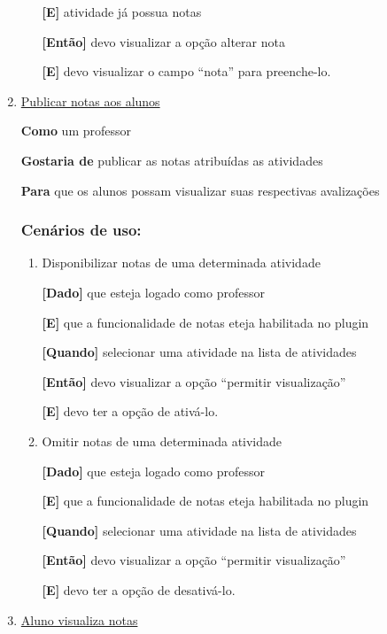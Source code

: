 \begin{enumerate}
\begin{enumerate}
\textbf{[E]} atividade já possua notas

\textbf{[Então]} devo visualizar a opção alterar nota

\textbf{[E]} devo visualizar o campo ``nota'' para preenche-lo.

\end{enumerate}


\item \underline{Publicar notas aos alunos}

\textbf{Como} um professor

\textbf{Gostaria de} publicar as notas atribuídas as atividades

\textbf{Para} que os alunos possam visualizar suas respectivas avalizações

\subsubsection*{Cenários de uso:}

\begin{enumerate}
\item Disponibilizar notas de uma determinada atividade

\textbf{[Dado]} que esteja logado como professor

\textbf{[E]} que a funcionalidade de notas eteja habilitada no plugin

\textbf{[Quando]} selecionar uma atividade na lista de atividades

\textbf{[Então]} devo visualizar a opção ``permitir visualização''

\textbf{[E]} devo ter a opção de ativá-lo.

\item Omitir notas de uma determinada atividade

\textbf{[Dado]} que esteja logado como professor

\textbf{[E]} que a funcionalidade de notas eteja habilitada no plugin

\textbf{[Quando]} selecionar uma atividade na lista de atividades

\textbf{[Então]} devo visualizar a opção ``permitir visualização''

\textbf{[E]} devo ter a opção de desativá-lo.

\end{enumerate}

\item \underline{Aluno visualiza notas}


\end{enumerate}
